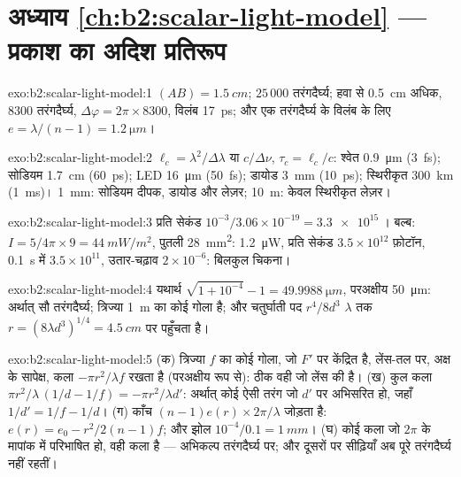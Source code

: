 \section*{अध्याय \ref{ch:b2:scalar-light-model} --- प्रकाश का अदिश प्रतिरूप}

\begin{solution}{exo:b2:scalar-light-model:1}
$(AB) = \qty{1.5}{cm}$; $25\,000$ तरंगदैर्घ्य; हवा से \qty{0.5}{cm} अधिक, $8300$
तरंगदैर्घ्य, $\Delta\varphi = 2\pi \times 8300$, विलंब \qty{17}{ps}; और एक तरंगदैर्घ्य के
विलंब के लिए $e = \lambda/(n - 1) = \qty{1.2}{\micro m}$।
\end{solution}

\begin{solution}{exo:b2:scalar-light-model:2}
$\ell_c = \lambda^2/\Delta\lambda$ या $c/\Delta\nu$, $\tau_c = \ell_c/c$: श्वेत \qty{0.9}{\micro m} (\qty{3}{fs});
सोडियम \qty{1.7}{cm} (\qty{60}{ps}); LED \qty{16}{\micro m} (\qty{50}{fs}); डायोड \qty{3}{mm}
(\qty{10}{ps}); स्थिरीकृत \qty{300}{km} (\qty{1}{ms})। \qty{1}{mm}: सोडियम दीपक,
डायोड और लेज़र; \qty{10}{m}: केवल स्थिरीकृत लेज़र।
\end{solution}

\begin{solution}{exo:b2:scalar-light-model:3}
प्रति सेकंड $10^{-3}/3.06 \times 10^{-19} = \qty{3.3e15}{}$। बल्ब: $I = 5/4\pi \times 9 =
\qty{44}{mW/m^2}$, पुतली \qty{28}{mm^2}: \qty{1.2}{\micro W}, प्रति सेकंड $3.5 \times 10^{12}$ फ़ोटॉन,
\qty{0.1}{s} में $3.5 \times 10^{11}$, उतार-चढ़ाव $2 \times 10^{-6}$: बिलकुल चिकना।
\end{solution}

\begin{solution}{exo:b2:scalar-light-model:4}
यथार्थ $\sqrt{1 + 10^{-4}} - 1 = \qty{49.9988}{\micro m}$, परअक्षीय \qty{50}{\micro m}: अर्थात् सौ
तरंगदैर्घ्य;  त्रिज्या \qty{1}{m} का कोई गोला है; और
चतुर्घाती पद $r^4/8d^3$ $\lambda$ तक $r = (8\lambda d^3)^{1/4} = \qty{4.5}{cm}$ पर पहुँचता है।
\end{solution}

\begin{solution}{exo:b2:scalar-light-model:5}
(क) त्रिज्या $f$ का कोई गोला, जो $F'$ पर केंद्रित है, लेंस-तल पर, अक्ष के सापेक्ष,
कला $-\pi r^2/\lambda f$ रखता है (परअक्षीय रूप से): ठीक वही जो
लेंस की है। (ख) कुल कला $\pi r^2/\lambda\,(1/d - 1/f) = -\pi r^2/\lambda d'$: अर्थात् कोई ऐसी तरंग
जो $d'$ पर अभिसरित हो, जहाँ $1/d' = 1/f - 1/d$। (ग) काँच $(n - 1)e(r)
\times2\pi/\lambda$ जोड़ता है: $e(r) = e_0 - r^2/2(n - 1)f$; और झोल $10^{-4}/0.1 = \qty{1}{mm}$। (घ) कोई
कला जो $2\pi$ के मापांक में परिभाषित हो, वही कला है --- अभिकल्प
तरंगदैर्घ्य पर; और दूसरों पर सीढ़ियाँ अब पूरे तरंगदैर्घ्य नहीं रहतीं।
\end{solution}

